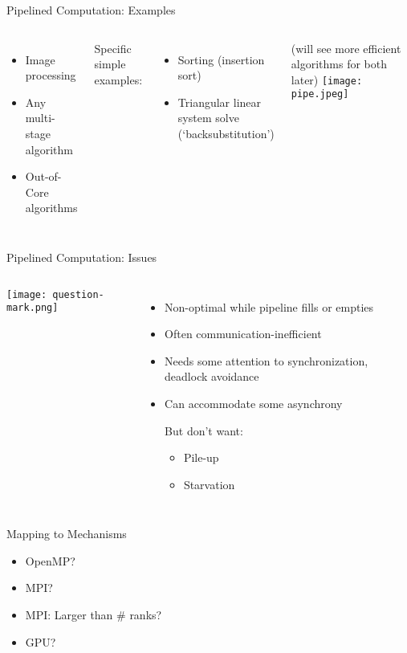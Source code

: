 \documentclass[english,compress]{beamer}
\begin{document}
\begin{frame}{Pipelined Computation: Examples}
  \begin{columns}
      \begin{itemize}
        \item Image processing
        \item Any multi-stage algorithm
        \item Out-of-Core algorithms
      \end{itemize}

      \bigskip
      Specific simple examples:
      \begin{itemize}
        \item Sorting (insertion sort)
        \item Triangular linear system solve \\ (`backsubstitution')
      \end{itemize}
      (will see more efficient algorithms for both later)
      \texttt{[image: pipe.jpeg]}
  \end{columns}
\end{frame}
\begin{frame}{Pipelined Computation: Issues}
  \begin{columns}
      \texttt{[image: question-mark.png]}
      \begin{itemize}
        \item Non-optimal while pipeline fills or empties
        \item Often communication-inefficient
        \item Needs some attention to synchronization,
          deadlock avoidance
        \item Can accommodate some asynchrony

          But don't want:
          \begin{itemize}
            \item Pile-up
            \item Starvation
          \end{itemize}
      \end{itemize}
  \end{columns}
\end{frame}
\begin{frame}{Mapping to Mechanisms}
  \begin{itemize}[<+->]
    \item OpenMP?
    \item MPI?
    \item MPI: Larger than \# ranks?
    \item GPU?
  \end{itemize}
\end{frame}
\end{document}

